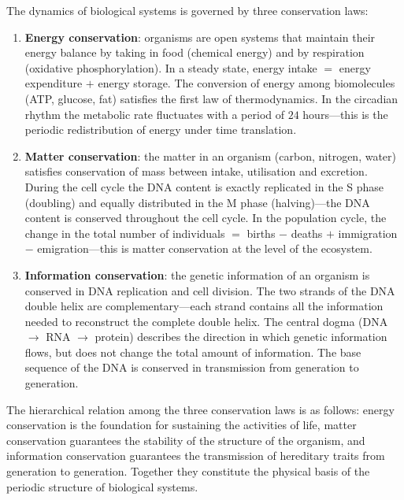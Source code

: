 \begin{theorem}\label{thm:biological_conservation}
The dynamics of biological systems is governed by three conservation laws:
\begin{enumerate}[label=(\roman*)]
    \item \textbf{Energy conservation}: organisms are open systems that maintain their energy balance by taking in food (chemical energy) and by respiration (oxidative phosphorylation). In a steady state, energy intake $=$ energy expenditure $+$ energy storage. The conversion of energy among biomolecules (ATP, glucose, fat) satisfies the first law of thermodynamics. In the circadian rhythm the metabolic rate fluctuates with a period of $24$ hours---this is the periodic redistribution of energy under time translation.
    \item \textbf{Matter conservation}: the matter in an organism (carbon, nitrogen, water) satisfies conservation of mass between intake, utilisation and excretion. During the cell cycle the DNA content is exactly replicated in the S phase (doubling) and equally distributed in the M phase (halving)---the DNA content is conserved throughout the cell cycle. In the population cycle, the change in the total number of individuals $=$ births $-$ deaths $+$ immigration $-$ emigration---this is matter conservation at the level of the ecosystem.
    \item \textbf{Information conservation}: the genetic information of an organism is conserved in DNA replication and cell division. The two strands of the DNA double helix are complementary---each strand contains all the information needed to reconstruct the complete double helix. The central dogma (DNA $\to$ RNA $\to$ protein) describes the direction in which genetic information flows, but does not change the total amount of information. The base sequence of the DNA is conserved in transmission from generation to generation.
\end{enumerate}
The hierarchical relation among the three conservation laws is as follows: energy conservation is the foundation for sustaining the activities of life, matter conservation guarantees the stability of the structure of the organism, and information conservation guarantees the transmission of hereditary traits from generation to generation. Together they constitute the physical basis of the periodic structure of biological systems.
\end{theorem}


